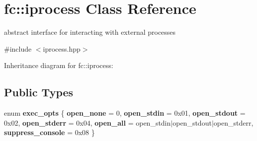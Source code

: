 \hypertarget{classfc_1_1iprocess}{}\section{fc\+:\+:iprocess Class Reference}
\label{classfc_1_1iprocess}


abstract interface for interacting with external processes  




{\ttfamily \#include $<$iprocess.\+hpp$>$}



Inheritance diagram for fc\+:\+:iprocess\+:
\subsection*{Public Types}
\begin{DoxyCompactItemize}
\item 
\mbox{\label{classfc_1_1iprocess_a5c8a22e5daa2e344574cf9b98ebbc7c0}} 
enum {\bfseries exec\+\_\+opts} \{ \newline
{\bfseries open\+\_\+none} = 0, 
{\bfseries open\+\_\+stdin} = 0x01, 
{\bfseries open\+\_\+stdout} = 0x02, 
{\bfseries open\+\_\+stderr} = 0x04, 
\newline
{\bfseries open\+\_\+all} = open\+\_\+stdin$\vert$open\+\_\+stdout$\vert$open\+\_\+stderr, 
{\bfseries suppress\+\_\+console} = 0x08
 \}
\end{DoxyCompactItemize}
